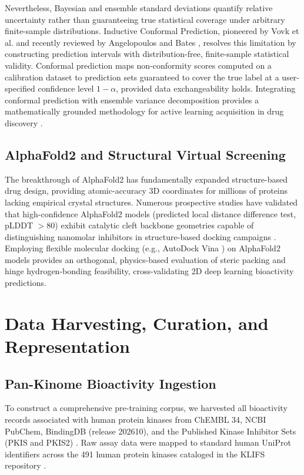 \documentclass[journal]{IEEEtran}
\begin{document}
Nevertheless, Bayesian and ensemble standard deviations quantify relative uncertainty rather than guaranteeing true statistical coverage under arbitrary finite-sample distributions. Inductive Conformal Prediction, pioneered by Vovk et al. \cite{vovk2005algorithmic} and recently reviewed by Angelopoulos and Bates \cite{angelopoulos2021gentle}, resolves this limitation by constructing prediction intervals with distribution-free, finite-sample statistical validity. Conformal prediction maps non-conformity scores computed on a calibration dataset to prediction sets guaranteed to cover the true label at a user-specified confidence level $1-\alpha$, provided data exchangeability holds. Integrating conformal prediction with ensemble variance decomposition provides a mathematically grounded methodology for active learning acquisition in drug discovery \cite{cortes2023conformal}.

\subsection{AlphaFold2 and Structural Virtual Screening}
The breakthrough of AlphaFold2 \cite{jumper2021highly} has fundamentally expanded structure-based drug design, providing atomic-accuracy 3D coordinates for millions of proteins lacking empirical crystal structures. Numerous prospective studies have validated that high-confidence AlphaFold2 models (predicted local distance difference test, pLDDT $> 80$) exhibit catalytic cleft backbone geometries capable of distinguishing nanomolar inhibitors in structure-based docking campaigns \cite{scardino2023alphafold, drakulic2022evaluating}. Employing flexible molecular docking (e.g., AutoDock Vina \cite{vina2021}) on AlphaFold2 models provides an orthogonal, physics-based evaluation of steric packing and hinge hydrogen-bonding feasibility, cross-validating 2D deep learning bioactivity predictions.

\section{Data Harvesting, Curation, and Representation}

\subsection{Pan-Kinome Bioactivity Ingestion}
To construct a comprehensive pre-training corpus, we harvested all bioactivity records associated with human protein kinases from ChEMBL 34, NCBI PubChem, BindingDB (release 202610), and the Published Kinase Inhibitor Sets (PKIS and PKIS2) \cite{drewry2017progress}. Raw assay data were mapped to standard human UniProt identifiers across the 491 human protein kinases cataloged in the KLIFS repository \cite{klifs2021}.
\end{document}
